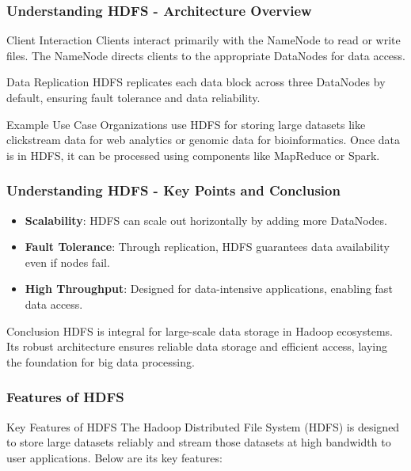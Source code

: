 \documentclass[aspectratio=169]{beamer}
\begin{document}
\begin{frame}[fragile]
    \frametitle{Understanding HDFS - Architecture Overview}
    \begin{block}{Client Interaction}
        Clients interact primarily with the NameNode to read or write files. The NameNode directs clients to the appropriate DataNodes for data access.
    \end{block}

    \begin{block}{Data Replication}
        HDFS replicates each data block across three DataNodes by default, ensuring fault tolerance and data reliability.
    \end{block}

    \begin{block}{Example Use Case}
        Organizations use HDFS for storing large datasets like clickstream data for web analytics or genomic data for bioinformatics. Once data is in HDFS, it can be processed using components like MapReduce or Spark.
    \end{block}
\end{frame}

\begin{frame}[fragile]
    \frametitle{Understanding HDFS - Key Points and Conclusion}
    \begin{itemize}
        \item \textbf{Scalability}: HDFS can scale out horizontally by adding more DataNodes.
        \item \textbf{Fault Tolerance}: Through replication, HDFS guarantees data availability even if nodes fail.
        \item \textbf{High Throughput}: Designed for data-intensive applications, enabling fast data access.
    \end{itemize}

    \begin{block}{Conclusion}
        HDFS is integral for large-scale data storage in Hadoop ecosystems. Its robust architecture ensures reliable data storage and efficient access, laying the foundation for big data processing.
    \end{block}
\end{frame}

\begin{frame}[fragile]
    \frametitle{Features of HDFS}
    \begin{block}{Key Features of HDFS}
        The Hadoop Distributed File System (HDFS) is designed to store large datasets reliably and stream those datasets at high bandwidth to user applications. Below are its key features:
    \end{block}
\end{frame}
\end{document}
